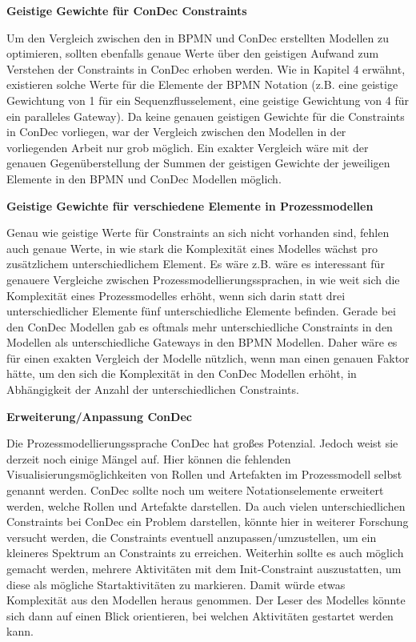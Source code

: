 \textbf{Geistige Gewichte für ConDec Constraints}

Um den Vergleich zwischen den in BPMN und ConDec erstellten Modellen zu optimieren, sollten ebenfalls genaue Werte über den geistigen Aufwand zum Verstehen der Constraints in ConDec erhoben werden. Wie in Kapitel 4 erwähnt, existieren solche Werte für die Elemente der BPMN Notation (z.B. eine geistige Gewichtung von 1 für ein Sequenzflusselement, eine geistige Gewichtung von 4 für ein paralleles Gateway). Da keine genauen geistigen Gewichte für die Constraints in ConDec vorliegen, war der Vergleich zwischen den Modellen in der vorliegenden Arbeit nur grob möglich. Ein exakter Vergleich wäre mit der genauen Gegenüberstellung der Summen der geistigen Gewichte der jeweiligen Elemente in den BPMN und ConDec Modellen möglich.\newline

\textbf{Geistige Gewichte für verschiedene Elemente in Prozessmodellen}

Genau wie geistige Werte für Constraints an sich nicht vorhanden sind, fehlen auch genaue Werte, in wie stark die Komplexität eines Modelles wächst pro zusätzlichem unterschiedlichem Element. Es wäre z.B. wäre es interessant für genauere Vergleiche zwischen Prozessmodellierungssprachen, in wie weit sich die Komplexität eines Prozessmodelles erhöht, wenn sich darin statt drei unterschiedlicher Elemente fünf unterschiedliche Elemente befinden. Gerade bei den ConDec Modellen gab es oftmals mehr unterschiedliche Constraints in den Modellen als unterschiedliche Gateways in den BPMN Modellen. Daher wäre es für einen exakten Vergleich der Modelle nützlich, wenn man einen genauen Faktor hätte, um den sich die Komplexität in den ConDec Modellen erhöht, in Abhängigkeit der Anzahl der unterschiedlichen Constraints.  


\textbf{Erweiterung/Anpassung ConDec}

Die Prozessmodellierungssprache ConDec hat großes Potenzial. Jedoch weist sie derzeit noch einige Mängel auf. Hier können die fehlenden Visualisierungsmöglichkeiten von Rollen und Artefakten im Prozessmodell selbst genannt werden. ConDec sollte noch um weitere Notationselemente erweitert werden, welche Rollen und Artefakte darstellen.\newline
Da auch vielen unterschiedlichen Constraints bei ConDec ein Problem darstellen, könnte hier in weiterer Forschung versucht werden, die Constraints eventuell anzupassen/umzustellen, um ein kleineres Spektrum an Constraints zu erreichen.\newline
Weiterhin sollte es auch möglich gemacht werden, mehrere Aktivitäten mit dem Init-Constraint auszustatten, um diese als mögliche Startaktivitäten zu markieren. Damit würde etwas Komplexität aus den Modellen heraus genommen. Der Leser des Modelles könnte sich dann auf einen Blick orientieren, bei welchen Aktivitäten gestartet werden kann.\newline

